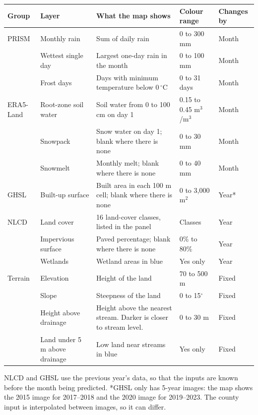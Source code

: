 \documentclass[11pt]{article}
\begin{document}
\begin{table}[H]
\centering
\small
\begin{tabularx}{\textwidth}{l>{\raggedright\arraybackslash}p{2.8cm}Yll}
\toprule
\textbf{Group} & \textbf{Layer} & \textbf{What the map shows} & \textbf{Colour range} & \textbf{Changes by} \\
\midrule
PRISM & Monthly rain & Sum of daily rain & 0 to 300 mm & Month \\
 & Wettest single day & Largest one-day rain in the month & 0 to 100 mm & Month \\
 & Frost days & Days with minimum temperature below 0\,$^\circ$C & 0 to 31 days & Month \\
\midrule
ERA5-Land & Root-zone soil water & Soil water from 0 to 100 cm on day 1 & 0.15 to 0.45 m$^3$/m$^3$ & Month \\
 & Snowpack & Snow water on day 1; blank where there is none & 0 to 30 mm & Month \\
 & Snowmelt & Monthly melt; blank where there is none & 0 to 40 mm & Month \\
\midrule
GHSL & Built-up surface & Built area in each 100 m cell; blank where there is none & 0 to 3,000 m$^2$ & Year* \\
\midrule
NLCD & Land cover & 16 land-cover classes, listed in the panel & Classes & Year \\
 & Impervious surface & Paved percentage; blank where there is none & 0\% to 80\% & Year \\
 & Wetlands & Wetland areas in blue & Yes only & Year \\
\midrule
Terrain & Elevation & Height of the land & 70 to 500 m & Fixed \\
 & Slope & Steepness of the land & 0 to 15$^\circ$ & Fixed \\
 & Height above drainage & Height above the nearest stream. Darker is closer to stream level. & 0 to 30 m & Fixed \\
 & Land under 5 m above drainage & Low land near streams in blue & Yes only & Fixed \\
\bottomrule
\end{tabularx}
\end{table}

\noindent NLCD and GHSL use the previous year's data, so that the inputs are known before the month
being predicted. *GHSL only has 5-year images: the map shows the 2015 image for 2017--2018 and the
2020 image for 2019--2023. The county input is interpolated between images, so it can differ.
\end{document}
